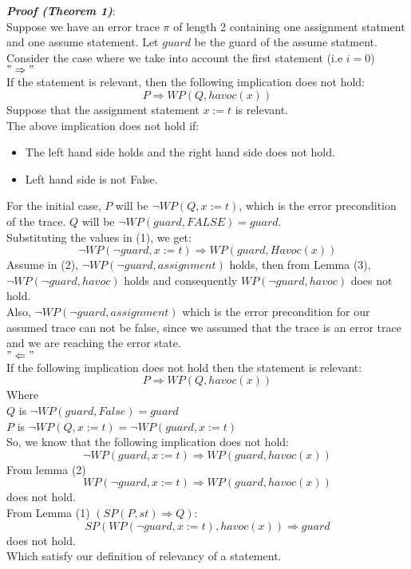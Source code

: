 \documentclass{article}
\begin{document}
\textit{\textbf{Proof (Theorem 1)}}:\\
Suppose we have an error trace $\pi$ of length 2 containing one assignment statment and one assume statement. Let $guard$ be the guard of the assume statment.\\
Consider the case where we take into account the first statement (i.e $i=0$)\\
$"\Rightarrow"$ \\
If the statement is relevant, then the following implication does not hold:
\begin{equation} 
P \Rightarrow WP(Q,havoc(x)) 
\end{equation}
Suppose that the assignment statement $x:=t$ is relevant.\\
The above implication does not hold if:
\begin{itemize}
  \item The left hand side holds and the right hand side does not hold.
  \item Left hand side is not False.
\end{itemize}
For the initial case, $P$ will be $\neg WP(Q, x:=t)$, which is the error precondition of the trace. $Q$ will be $\neg WP(guard, FALSE) = guard$.\\
Substituting the values in (1), we get:
\begin{equation}
\neg WP(\neg guard, x:=t) \Rightarrow WP(guard, Havoc(x))
\end{equation}
Assume in (2), $\neg WP(\neg guard, assignment)$ holds, then from Lemma (3), \\$\neg WP(\neg guard, havoc)$ holds and consequently $WP(\neg guard,havoc)$ does not hold. \\
Also, $\neg WP(\neg guard, assignment)$ which is the error precondition for our assumed trace can not be false, since we assumed that the trace is an error trace and we are reaching the error state.\\
$"\Leftarrow"$\\
If the following implication does not hold then the statement is relevant:
\begin{equation} 
P \Rightarrow WP(Q,havoc(x)) 
\end{equation}
Where \\ 
$Q$ is $\neg WP(guard, False) = guard$\\
$P$ is $\neg WP(Q, x:=t) = \neg WP(guard, x:=t)$\\
So, we know that the following implication does not hold:\\
$$\neg WP(guard, x:=t) \Rightarrow WP(guard, havoc(x))$$
From lemma (2)
$$ WP(\neg guard, x:=t) \Rightarrow WP(guard, havoc(x))$$ does not hold.\\
From Lemma (1) $(SP(P,st) \Rightarrow Q)$:\\
$$SP(WP(\neg guard, x:=t), havoc(x)) \Rightarrow guard$$
does not hold.\\
Which satisfy our definition of relevancy of a statement.
\end{document}
